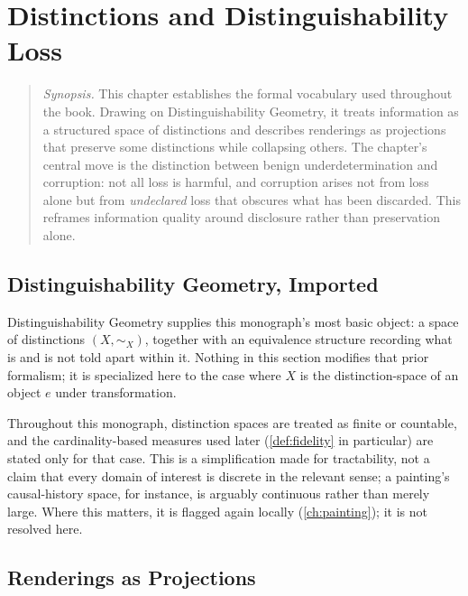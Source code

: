 \chapter{Distinctions and Distinguishability Loss}
\label{ch:distinctions}

\begin{quotation}
\noindent\textit{Synopsis.} This chapter establishes the formal vocabulary
used throughout the book. Drawing on Distinguishability Geometry, it treats
information as a structured space of distinctions and describes renderings
as projections that preserve some distinctions while collapsing others. The
chapter's central move is the distinction between benign underdetermination
and corruption: not all loss is harmful, and corruption arises not from
loss alone but from \emph{undeclared} loss that obscures what has been
discarded. This reframes information quality around disclosure rather than
preservation alone.
\end{quotation}

\section{Distinguishability Geometry, Imported}

Distinguishability Geometry supplies this monograph's most basic object: a
space of distinctions $(X,\sim_X)$, together with an equivalence structure
recording what is and is not told apart within it. Nothing in this section
modifies that prior formalism; it is specialized here to the case where
$X$ is the distinction-space of an object $e$ under transformation.

\begin{remark}
\label{rem:finite-distinctions}
Throughout this monograph, distinction spaces are treated as finite or
countable, and the cardinality-based measures used later
(\cref{def:fidelity} in particular) are stated only for that case. This is
a simplification made for tractability, not a claim that every domain of
interest is discrete in the relevant sense; a painting's causal-history
space, for instance, is arguably continuous rather than merely large. Where
this matters, it is flagged again locally (\cref{ch:painting}); it is not
resolved here.
\end{remark}

\section{Renderings as Projections}

